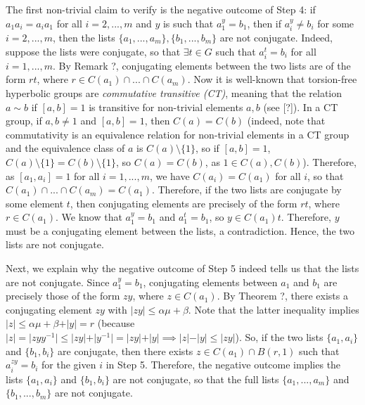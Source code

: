 \documentclass[12pt]{article}
\newcommand{\vs}{\vskip10pt}
\begin{document}
	\vs 
	
	The first non-trivial claim to verify is the negative outcome of Step 4: if $a_1 a_i = a_i a_1$ for all $i = 2,...,m$ and $y$ is such that $a_1^y = b_1$, then if $a_i^y \neq b_i$ for some $i = 2,...,m$, then the lists $\{a_1,...,a_m\}, \{b_1,...,b_m\}$ are not conjugate. Indeed, suppose the lists were conjugate, so that $\exists t \in G$ such that $a_i^t = b_i$ for all $i = 1,...,m$. By Remark ?, conjugating elements between the two lists are of the form $rt$, where $r \in C(a_1) \cap ... \cap C(a_m)$. Now it is well-known that torsion-free hyperbolic groups are \textit{commutative transitive (CT)}, meaning that the relation $a \sim b$ if $[a,b] = 1$ is transitive for non-trivial elements $a,b$ (see [?]). In a CT group, if $a,b \neq 1$ and $[a,b] = 1$, then $C(a) = C(b)$ (indeed, note that commutativity is an equivalence relation for non-trivial elements in a CT group and the equivalence class of $a$ is $C(a) \setminus \{1\}$, so if $[a,b] = 1$, $C(a) \setminus \{1\} = C(b) \setminus \{1\}$, so $C(a) = C(b)$, as $1 \in C(a), C(b)$). Therefore, as $[a_1, a_i] = 1$ for all $i = 1,...,m$, we have $C(a_i) = C(a_1)$ for all $i$, so that $ C(a_1) \cap ... \cap C(a_m) = C(a_1)$. Therefore, if the two lists are conjugate by some element $t$, then conjugating elements are precisely of the form $rt$, where $r \in C(a_1)$. We know that $a_1^y = b_1$ and $a_1^t = b_1$, so $y \in C(a_1)t$. Therefore, $y$ must be a conjugating element between the lists, a contradiction. Hence, the two lists are not conjugate. 
	
	\vs 
	
	Next, we explain why the negative outcome of Step 5 indeed tells us that the lists are not conjugate. Since $a_1^y = b_1$, conjugating elements between $a_1$ and $b_1$ are precisely those of the form $zy$, where $z \in C(a_1)$. By Theorem ?, there exists a conjugating element $zy$ with $\vert zy \vert \leq \alpha \mu + \beta$. Note that the latter inequality implies $\vert z \vert \leq \alpha \mu + \beta + \vert y \vert = r$ (because $\vert z \vert = \vert zyy^{-1} \vert \leq \vert zy \vert + \vert y^{-1} \vert  =  \vert zy \vert + \vert y \vert \implies \vert z \vert - \vert y \vert \leq \vert zy \vert $). So, if the two lists $\{a_1, a_i\}$ and $\{b_1, b_i\}$ are conjugate, then there exists $z \in C(a_1) \cap B(r,1)$ such that $a_i^{zy} = b_i$ for the given $i$ in Step 5. Therefore, the negative outcome implies the lists $\{a_1, a_i\}$ and $\{b_1, b_i\}$ are not conjugate, so that the full lists $\{a_1,...,a_m\}$ and $\{b_1,...,b_m\}$ are not conjugate. 
	
\end{document}
